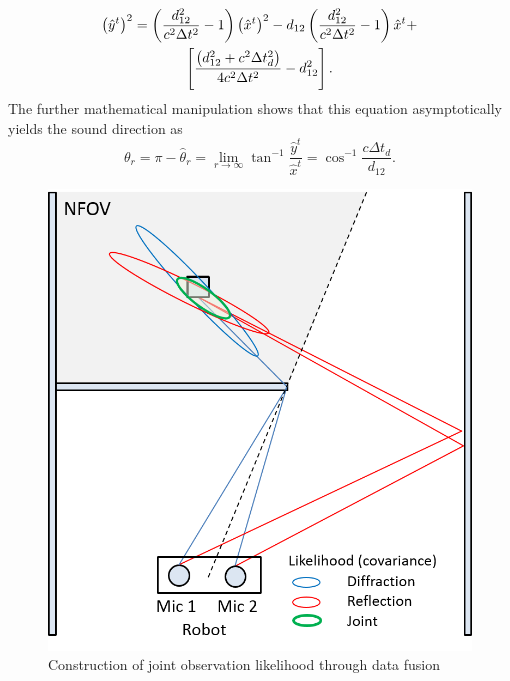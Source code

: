 \documentclass[letterpaper, 10 pt, conference]{ieeeconf}  %
\begin{document}
\begin{multline}\label{eq:estimation_reflection}
\left ( \hat y^t \right )^2 = \left ( \frac{d_{12}^2}{c^2 \Delta t^2} - 1 \right ) \left ( \hat x^t \right )^2 - d_{12} \left ( \frac{d_{12}^2}{c^2 \Delta t^2} - 1 \right ) \hat x^t + \\ \left [ \frac{\left ( d_{12}^2 + c^2 \Delta t_d^2 \right )}{4 c^2 \Delta t^2} - d_{12}^2 \right ].  
\end{multline}
The further mathematical manipulation shows that this equation asymptotically yields the sound direction as 
\begin{equation}\label{eq:dirction_reflection}
\theta_r = \pi - \hat \theta_r = \lim_{r \rightarrow \infty} \tan^{-1} \frac{\hat y^t}{\hat x^t}= \cos^{-1} \frac{c \Delta t_d}{d_{12}}.   
\end{equation}

\begin{figure}[thpb]
  \centering
  \includegraphics[width=0.7\columnwidth]{Figures/data_fusion.png} %
  \caption{Construction of joint observation likelihood through data fusion}
  \label{fig:data_fusion}
\end{figure}
\end{document}
